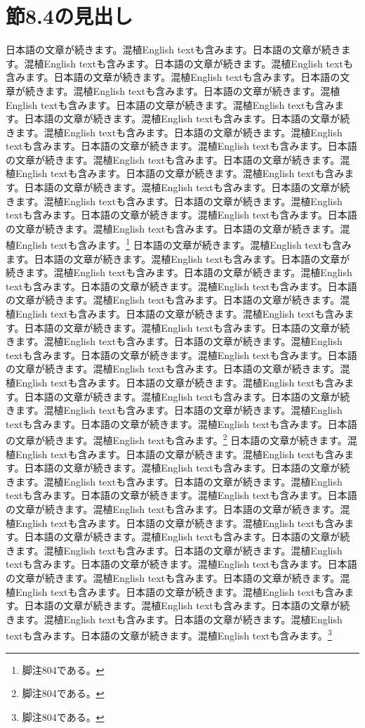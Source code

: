 \documentclass[pdflatex,book]{jlreq}
\begin{document}
\section{節8.4の見出し}
日本語の文章が続きます。混植English textも含みます。日本語の文章が続きます。混植English textも含みます。日本語の文章が続きます。混植English textも含みます。日本語の文章が続きます。混植English textも含みます。日本語の文章が続きます。混植English textも含みます。日本語の文章が続きます。混植English textも含みます。日本語の文章が続きます。混植English textも含みます。日本語の文章が続きます。混植English textも含みます。日本語の文章が続きます。混植English textも含みます。日本語の文章が続きます。混植English textも含みます。日本語の文章が続きます。混植English textも含みます。日本語の文章が続きます。混植English textも含みます。日本語の文章が続きます。混植English textも含みます。日本語の文章が続きます。混植English textも含みます。日本語の文章が続きます。混植English textも含みます。日本語の文章が続きます。混植English textも含みます。日本語の文章が続きます。混植English textも含みます。日本語の文章が続きます。混植English textも含みます。日本語の文章が続きます。混植English textも含みます。日本語の文章が続きます。混植English textも含みます。\footnote{脚注804である。}
日本語の文章が続きます。混植English textも含みます。日本語の文章が続きます。混植English textも含みます。日本語の文章が続きます。混植English textも含みます。日本語の文章が続きます。混植English textも含みます。日本語の文章が続きます。混植English textも含みます。日本語の文章が続きます。混植English textも含みます。日本語の文章が続きます。混植English textも含みます。日本語の文章が続きます。混植English textも含みます。日本語の文章が続きます。混植English textも含みます。日本語の文章が続きます。混植English textも含みます。日本語の文章が続きます。混植English textも含みます。日本語の文章が続きます。混植English textも含みます。日本語の文章が続きます。混植English textも含みます。日本語の文章が続きます。混植English textも含みます。日本語の文章が続きます。混植English textも含みます。日本語の文章が続きます。混植English textも含みます。日本語の文章が続きます。混植English textも含みます。日本語の文章が続きます。混植English textも含みます。日本語の文章が続きます。混植English textも含みます。日本語の文章が続きます。混植English textも含みます。\footnote{脚注804である。}
日本語の文章が続きます。混植English textも含みます。日本語の文章が続きます。混植English textも含みます。日本語の文章が続きます。混植English textも含みます。日本語の文章が続きます。混植English textも含みます。日本語の文章が続きます。混植English textも含みます。日本語の文章が続きます。混植English textも含みます。日本語の文章が続きます。混植English textも含みます。日本語の文章が続きます。混植English textも含みます。日本語の文章が続きます。混植English textも含みます。日本語の文章が続きます。混植English textも含みます。日本語の文章が続きます。混植English textも含みます。日本語の文章が続きます。混植English textも含みます。日本語の文章が続きます。混植English textも含みます。日本語の文章が続きます。混植English textも含みます。日本語の文章が続きます。混植English textも含みます。日本語の文章が続きます。混植English textも含みます。日本語の文章が続きます。混植English textも含みます。日本語の文章が続きます。混植English textも含みます。日本語の文章が続きます。混植English textも含みます。日本語の文章が続きます。混植English textも含みます。\footnote{脚注804である。}
\end{document}
